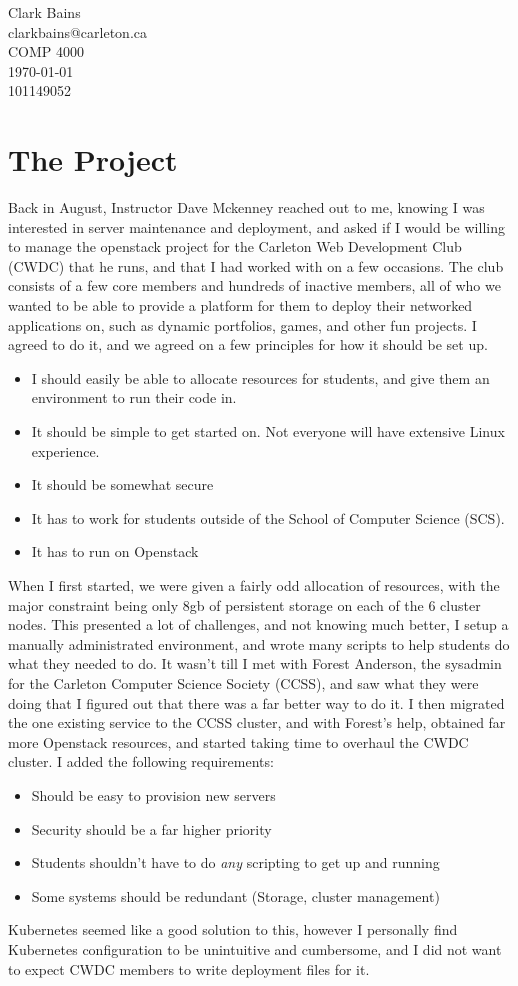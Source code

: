 \documentclass{article}
\begin{document}
\begin{center}
    {\Large Clark Bains}\\
    clarkbains@carleton.ca\\
    COMP 4000 \\
    \today \\
    101149052
\end{center}
\section{The Project}
Back in August, Instructor Dave Mckenney reached out to me, knowing I was interested in server maintenance and deployment, and asked if I would be willing to manage the openstack project for the Carleton Web Development Club (CWDC) that he runs, and that I had worked with on a few occasions. The club consists of a few core members and hundreds of inactive members, all of who we wanted to be able to provide a platform for them to deploy their networked applications on, such as dynamic portfolios, games, and other fun projects. I agreed to do it, and we agreed on a few principles for how it should be set up.
\begin{itemize}
    \item I should easily be able to allocate resources for students, and give them an environment to run their code in.
    \item It should be simple to get started on. Not everyone will have extensive Linux experience.
    \item It should be somewhat secure
    \item It has to work for students outside of the School of Computer Science (SCS).
    \item It has to run on Openstack
\end{itemize}
When I first started, we were given a fairly odd allocation of resources, with the major constraint being only 8gb of persistent storage on each of the 6 cluster nodes. This presented a lot of challenges, and not knowing much better, I setup a manually administrated environment, and wrote many scripts to help students do what they needed to do. It wasn't till I met with Forest Anderson, the sysadmin for the Carleton Computer Science Society (CCSS), and saw what they were doing that I figured out that there was a far better way to do it. I then migrated the one existing service to the CCSS cluster, and with Forest's help, obtained far more Openstack resources, and started taking time to overhaul the CWDC cluster. I added the following requirements:
\begin{itemize}
    \item Should be easy to provision new servers
    \item Security should be a far higher priority
    \item Students shouldn't have to do \emph{any} scripting to get up and running
    \item Some systems should be redundant (Storage, cluster management)
\end{itemize}
Kubernetes seemed like a good solution to this, however I personally find Kubernetes configuration to be unintuitive and cumbersome, and I did not want to expect CWDC members to write deployment files for it.
\end{document}

